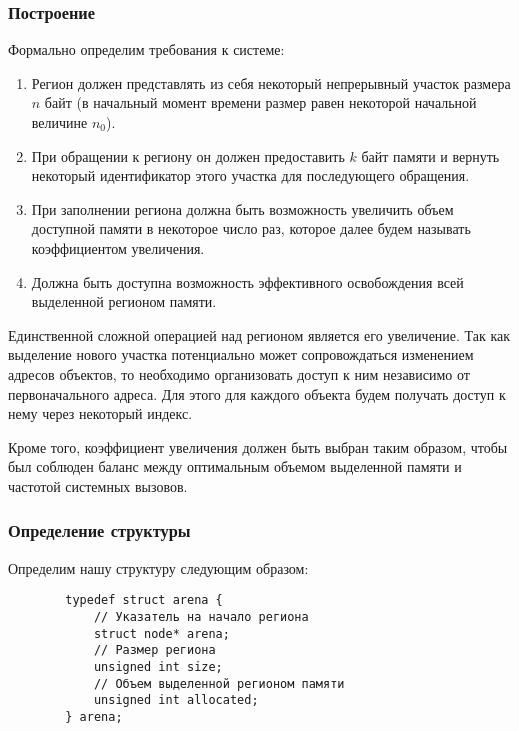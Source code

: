 \documentclass[bachelor, och, coursework]{SCWorks}
\begin{document}
    \subsubsection{Построение}
    Формально определим требования к системе:
    \begin{enumerate}
        \item Регион должен представлять из себя некоторый непрерывный участок размера $n$ байт 
        (в начальный момент времени размер равен некоторой начальной величине $n_0$).
        \item При обращении к региону он должен предоставить $k$ байт памяти и вернуть
        некоторый идентификатор этого участка для последующего обращения.
        \item При заполнении региона должна быть возможность увеличить объем доступной памяти в 
        некоторое число раз, которое далее будем называть
        коэффициентом увеличения.
        \item Должна быть доступна возможность эффективного освобождения всей
        выделенной регионом памяти.
    \end{enumerate}
    Единственной сложной операцией над регионом является его увеличение. 
    Так как выделение нового участка потенциально может сопровождаться изменением адресов объектов, 
    то необходимо организовать доступ к ним независимо от первоначального адреса. Для этого для 
    каждого объекта будем получать доступ к нему через некоторый индекс.

    Кроме того, коэффициент увеличения должен быть выбран таким образом, чтобы был соблюден баланс 
    между оптимальным объемом выделенной памяти и частотой системных вызовов.

    \subsubsection{Определение структуры}
    Определим нашу структуру следующим образом:
    \begin{verbatim}
        typedef struct arena {
            // Указатель на начало региона
            struct node* arena;
            // Размер региона
            unsigned int size;
            // Объем выделенной регионом памяти
            unsigned int allocated;
        } arena;
    \end{verbatim}
\end{document}
